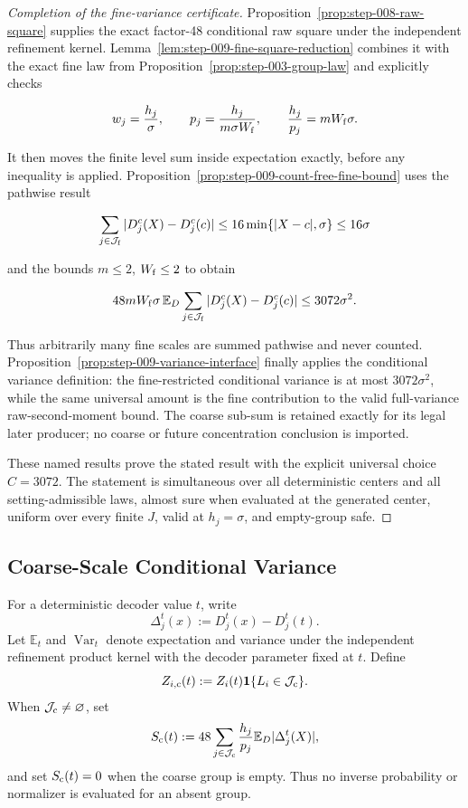 \begin{proof}[Completion of the fine-variance certificate]
Proposition~\ref{prop:step-008-raw-square} supplies the exact
factor-48 conditional raw square under the independent refinement kernel.
Lemma~\ref{lem:step-009-fine-square-reduction} combines it with the
exact fine law from
Proposition~\ref{prop:step-003-group-law} and explicitly checks

\[
w_j=\frac{h_j}{\sigma},
\qquad
p_j=\frac{h_j}{m\sigma W_{\rm f}},
\qquad
\frac{h_j}{p_j}=mW_{\rm f}\sigma.
\]

It then moves the finite level sum inside expectation exactly, before any
inequality is applied. Proposition~\ref{prop:step-009-count-free-fine-bound}
uses the pathwise result

\[
\sum_{j\in\mathcal J_{\rm f}}|D_j^c(X)-D_j^c(c)|
\leq16\min\{|X-c|,\sigma\}
\leq16\sigma
\]

and the bounds \(m\leq2\), \(W_{\rm f}\leq2\) to obtain

\[
48mW_{\rm f}\sigma\,
\mathbb E_D\sum_{j\in\mathcal J_{\rm f}}
|D_j^c(X)-D_j^c(c)|
\leq3072\sigma^2.
\]

Thus arbitrarily many fine scales are summed pathwise and never counted.
Proposition~\ref{prop:step-009-variance-interface} finally applies the
conditional variance definition: the fine-restricted conditional variance is
at most \(3072\sigma^2\), while the same universal amount is the fine
contribution to the valid full-variance raw-second-moment bound. The coarse
sub-sum is retained exactly for its legal later producer; no coarse or future
concentration conclusion is imported.

These named results prove the stated result with the explicit universal
choice \(C=3072\). The statement is simultaneous over all deterministic
centers and all setting-admissible laws, almost sure when evaluated at the
generated center, uniform over every finite \(J\), valid at \(h_j=\sigma\),
and empty-group safe.
\end{proof}

\subsection{Coarse-Scale Conditional Variance}\label{app:step-010}

For a deterministic decoder value \(t\), write
\[
\Delta_j^t(x):=D_j^t(x)-D_j^t(t).
\]
Let \(\mathbb E_t\) and \(\operatorname{Var}_t\) denote expectation and
variance under the independent refinement product kernel with the decoder
parameter fixed at \(t\).  Define
\[
Z_{i,{\rm c}}(t):=Z_i(t)\mathbf 1\{L_i\in\mathcal J_{\rm c}\}.
\]
When \(\mathcal J_{\rm c}\neq\varnothing\), set
\[
S_{\rm c}(t)
:=48\sum_{j\in\mathcal J_{\rm c}}\frac{h_j}{p_j}
       \mathbb E_D|\Delta_j^t(X)|,
\]
and set \(S_{\rm c}(t)=0\) when the coarse group is empty.  Thus no inverse
probability or normalizer is evaluated for an absent group.

